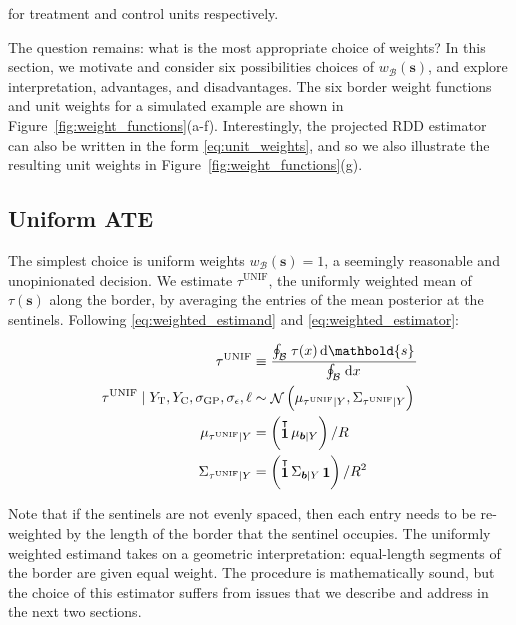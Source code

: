 \documentclass[letter]{article}
\DeclareMathOperator{\normal}{\mathcal{N}}
\DeclareMathOperator{\ones}{\mathbf{1}}
\newcommand{\trans}{^{\intercal}}
\newcommand{\treat}{\mathrm{T}}
\newcommand{\ctrol}{\mathrm{C}}
\newcommand{\sigmaf}{\sigma_{\mathrm{GP}}}
\newcommand{\sigman}{\sigma_{\epsilon}}
\newcommand{\svec}{\mathbold{s}}
\newcommand{\border}{\mathcal{B}}
\newcommand{\sentinels}{\bm{b}}
\newcommand{\unifavg}{\tau^{\mathrm{UNIF}}}
\newcommand{\eqlabel}[1]{\label{#1}}
\newcommand{\numsent}{R}
\newcommand{\weightb}{w_{\border}}
\begin{document}
for treatment and control units respectively.

The question remains: what is the most appropriate choice of weights? In this section, we motivate and consider six possibilities choices of \(\weightb(\svec)\), and explore interpretation, advantages, and disadvantages.
The six border weight functions and unit weights for a simulated example are shown in Figure~\ref{fig:weight_functions}(a-f).
Interestingly, the projected RDD estimator can also be written in the form \eqref{eq:unit_weights}, and so we also illustrate the resulting unit weights in Figure~\ref{fig:weight_functions}(g).
    


    	\subsection{Uniform ATE}\label{uniform-ate}

The simplest choice is uniform weights \(\weightb(\svec)=1\), a seemingly reasonable and unopinionated decision.
We estimate \(\unifavg\), the uniformly weighted mean of \(\tau(\svec)\) along the border, by averaging the entries of the mean posterior at the sentinels.
Following \eqref{eq:weighted_estimand} and \eqref{eq:weighted_estimator}:

\begin{equation}\begin{split}
    \unifavg &\equiv \frac{\oint_\border \left. \tau(x) \dif \svec \right.}
                          {\oint_\border \left. \dif x \right.} \\
    \unifavg \mid Y_\treat{}, Y_\ctrol{}, \sigmaf, \sigman, \ell &\sim \normal\del{\mu_{\unifavg \mid Y}, \Sigma_{\unifavg \mid Y}} \\
    \mu_{\unifavg \mid Y} &= \del{\ones\trans \mu_{\sentinels \mid Y}} / \numsent \\
    \Sigma_{\unifavg \mid Y} &= \del{\ones\trans \Sigma_{\sentinels \mid Y} \ones} / \numsent^2
\end{split}
\eqlabel{eq:unifavg}
\end{equation}

Note that if the sentinels are not evenly spaced, then each entry needs to be re-weighted by the length of the border that the sentinel occupies.
The uniformly weighted estimand takes on a geometric interpretation: equal-length segments of the border are given equal weight.
The procedure is mathematically sound, but the choice of this estimator suffers from issues that we describe and address in the next two sections.
    
\end{document}
